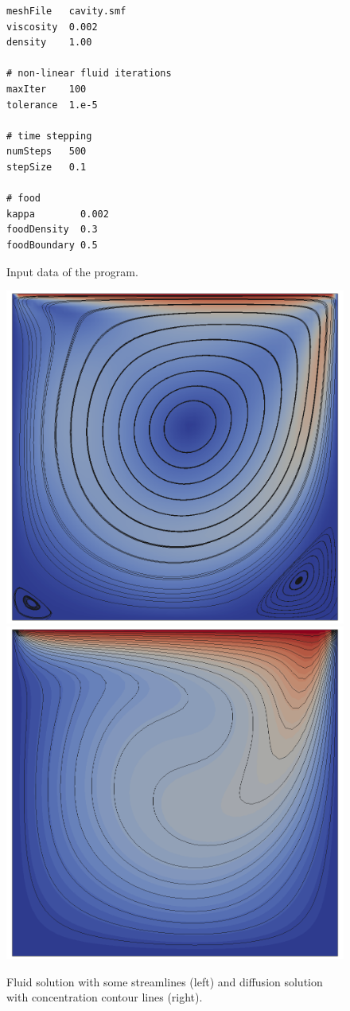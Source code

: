 \documentclass[a4paper,DIV=12,10pt]{scrartcl}
\begin{document}
\begin{figure}[htbp]
  \centering
  \begin{verbatim}
meshFile   cavity.smf
viscosity  0.002
density    1.00

# non-linear fluid iterations
maxIter    100
tolerance  1.e-5

# time stepping
numSteps   500
stepSize   0.1

# food
kappa        0.002
foodDensity  0.3
foodBoundary 0.5

  \end{verbatim}
  \caption{Input data of the program.}
  \label{fig:inp3}
\end{figure}

\begin{figure}[htbp]
  \centering
  \includegraphics[width=.45\textwidth]{streamlines}\quad
  \includegraphics[width=.45\textwidth]{food}
  \caption{Fluid solution with some streamlines (left) and diffusion
    solution with concentration contour lines (right).}
  \label{fig:food}
\end{figure}
\end{document}
